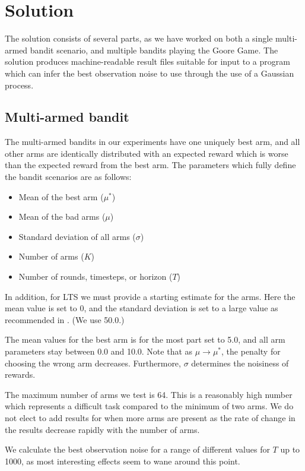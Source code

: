 \chapter{Solution}
\label{ch:solution}

The solution consists of several parts, as we have worked on both a single multi-armed bandit scenario, and multiple bandits playing the Goore Game.
The solution produces machine-readable result files suitable for input to a program which can infer the best observation noise to use through the use of a Gaussian process.


\section{Multi-armed bandit}
The multi-armed bandits in our experiments have one uniquely best arm, and all other arms are identically distributed with an expected reward which is worse than the expected reward from the best arm.
The parameters which fully define the bandit scenarios are as follows:
\begin{itemize}
    \item Mean of the best arm ($\mu^*$)
    \item Mean of the bad arms ($\mu$)
    \item Standard deviation of all arms ($\sigma$)
    \item Number of arms ($K$)
    \item Number of rounds, timesteps, or horizon ($T$)
\end{itemize}

In addition, for LTS we must provide a starting estimate for the arms.
Here the mean value is set to 0, and the standard deviation is set to a large value as recommended in \cite{Glimsdal12}.
(We use 50.0.)

The mean values for the best arm is for the most part set to 5.0, and all arm parameters stay between 0.0 and 10.0.
Note that as $\mu \to \mu^*$, the penalty for choosing the wrong arm decreases.
Furthermore, $\sigma$ determines the noisiness of rewards.

The maximum number of arms we test is 64.
This is a reasonably high number which represents a difficult task compared to the minimum of two arms.
We do not elect to add results for when more arms are present as the rate of change in the results decrease rapidly with the number of arms.

We calculate the best observation noise for a range of different values for $T$ up to 1000, as most interesting effects seem to wane around this point.

